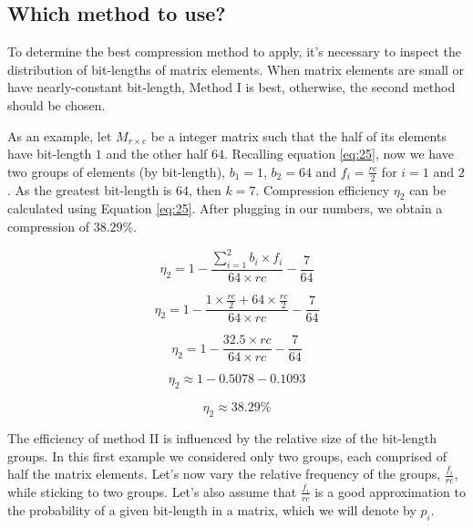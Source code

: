\documentclass[10pt]{article}
\begin{document}
\subsection*{Which method to use?}

To determine the best compression method to apply, it's necessary to inspect the distribution of bit-lengths of matrix elements. When matrix elements are small or have nearly-constant bit-length, Method I is best, otherwise, the second method should be chosen.



As an example, let $M_{r\times c}$ be a integer matrix such that the half of its elements have bit-length $1$ and the other half $64$. Recalling equation \ref{eq:25}, now we have two groups of elements (by bit-length), $b_1=1 $, $b_2=64$ and $f_i = \frac{rc}{2}$ for $i = 1 \text{ and } 2$. As the greatest bit-length is $64$, then $k=7$. Compression efficiency $\eta_2$ can be calculated using Equation \ref{eq:25}. After plugging in our numbers, we obtain a compression of $38.29\%$.

\begin{equation*} %
 \eta_2 = 1 - \frac{\sum_{i=1}^{2}  b_i \times f_i }{64 \times rc} - \frac{7}{64} 
\end{equation*}

\begin{equation*} %
 \eta_2 = 1 - \frac{  1 \times \frac{rc}{2} + 64 \times \frac{rc}{2} }{64 \times rc} - \frac{7}{64} 
\end{equation*}

\begin{equation*} %
 \eta_2 = 1 - \frac{  32.5  \times rc }{64 \times rc} - \frac{7}{64} 
\end{equation*}

\begin{equation*} %
 \eta_2 \approx 1 - 0.5078 - 0.1093
\end{equation*}

\begin{equation*} %
 \eta_2 \approx 38.29\%
\end{equation*}

The efficiency of method II is influenced by the relative size of the bit-length groups. In this first example we considered only two groups, each comprised of half the matrix elements. Let's now vary the relative frequency of the groups, $\frac{f_i}{rc}$, while sticking to two groups. Let's also assume that $\frac{f_i}{rc}$ is a good approximation to the probability of a given bit-length in a matrix, which we will denote by $p_i$.
\end{document}
